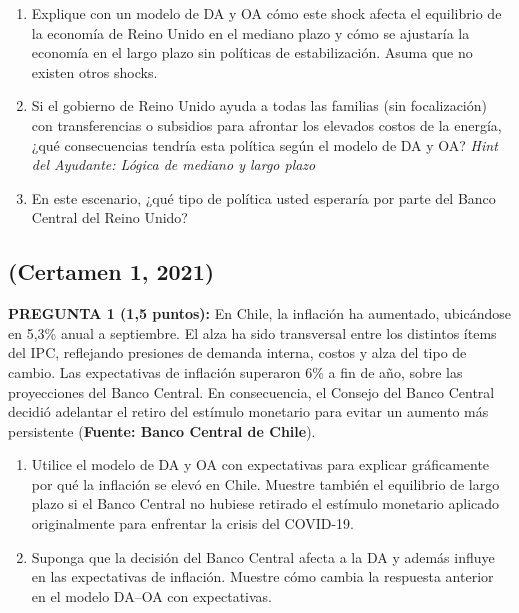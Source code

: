 \documentclass[11pt,addpoints]{article}
\begin{document}
\vspace*{0.1cm}
\begin{enumerate}[label=\alph*)]
    \item Explique con un modelo de DA y OA cómo este shock afecta el equilibrio de la economía de Reino Unido en el mediano plazo y cómo se ajustaría la economía en el largo plazo sin políticas de estabilización. Asuma que no existen otros shocks.  
    \item Si el gobierno de Reino Unido ayuda a todas las familias (sin focalización) con transferencias o subsidios para afrontar los elevados costos de la energía, ¿qué consecuencias tendría esta política según el modelo de DA y OA? \textit{Hint del Ayudante: Lógica de mediano y largo plazo}
    \item En este escenario, ¿qué tipo de política usted esperaría por parte del Banco Central del Reino Unido?  
\end{enumerate}


\newpage
\vspace*{0.1cm}
\subsection*{(Certamen 1, 2021)}
\textbf{PREGUNTA 1 (1,5 puntos):}  
En Chile, la inflación ha aumentado, ubicándose en 5,3\% anual a septiembre. El alza ha sido transversal entre los distintos ítems del IPC, reflejando presiones de demanda interna, costos y alza del tipo de cambio. Las expectativas de inflación superaron 6\% a fin de año, sobre las proyecciones del Banco Central. En consecuencia, el Consejo del Banco Central decidió adelantar el retiro del estímulo monetario para evitar un aumento más persistente (\textbf{Fuente: Banco Central de Chile}).  

\begin{enumerate}[label=\alph*)]
    \item Utilice el modelo de DA y OA con expectativas para explicar gráficamente por qué la inflación se elevó en Chile. Muestre también el equilibrio de largo plazo si el Banco Central no hubiese retirado el estímulo monetario aplicado originalmente para enfrentar la crisis del COVID-19.  
    \item Suponga que la decisión del Banco Central afecta a la DA y además influye en las expectativas de inflación. Muestre cómo cambia la respuesta anterior en el modelo DA--OA con expectativas.  
\end{enumerate}

\vspace{0.3cm}
\end{document}
